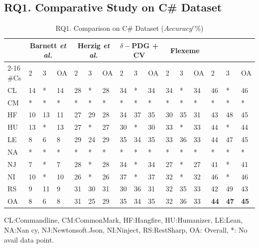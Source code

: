 \subsection{RQ1. Comparative Study on C\# Dataset}
\label{rq1:sec}

\begin{table}[t]
	\caption{RQ1. Comparison on C\# Dataset ($Accuracy^c$\%)}
	\vspace{-0.1in}
	\begin{center}
		\footnotesize
		\tabcolsep 4pt
		\renewcommand{\arraystretch}{1} \begin{tabular}{p{0.2cm}<{\centering}|p{0.25cm}<{\centering}p{0.25cm}<{\centering}p{0.25cm}<{\centering}|p{0.25cm}<{\centering}p{0.25cm}<{\centering}p{0.25cm}<{\centering}|p{0.25cm}<{\centering}p{0.25cm}<{\centering}p{0.25cm}<{\centering}|p{0.25cm}<{\centering}p{0.25cm}<{\centering}p{0.25cm}<{\centering}|p{0.25cm}<{\centering}p{0.25cm}<{\centering}p{0.25cm}<{\centering}}
			
			\hline
		\multirow{2}{*}{}          & \multicolumn{3}{c|}{Barnett {\em et al.}} & \multicolumn{3}{c|}{Herzig {\em et al.}} & \multicolumn{3}{c|}{$\delta-$PDG + CV} & \multicolumn{3}{c|}{Flexeme} & \multicolumn{3}{c}{\bf {\tool}}\\
		\cline{2-16}
	\#Cs	 & 2 & 3 & OA & 2 & 3 & OA & 2 & 3 & OA & 2 & 3 & OA & 2 & 3 & OA \\
			\hline
			CL   & 14 & *    & 14 & 28 & *    & 28 & 34 & *    & 34 & 34 & *    & 34 & 46 & *    & 46 \\
			CM   & *    & *    & *    & *    & *    & *    & *    & *    & *    & *    & *    & *    & *    & *    & *    \\
			HF   & 10 & 13 & 11 & 27 & 29 & 28 & 34 & 37 & 35 & 30 & 35 & 31 & 43 & 48 & 45 \\
			HU   & 13 & *    & 13 & 27 & *    & 27 & 30 & *    & 30 & 33 & *    & 33 & 44 & *    & 44 \\
			LE   & 8 & 6 & 8 & 29 & 24 & 29 & 35 & 34 & 35 & 33 & 36 & 33 & 44 & 47 & 45\\
			NA   & *    & *    & *    & *    & *    & *    & *    & *    & *    & *    & *    & *    & *    & *    & *    \\
			NJ   & 7 & *    & 7 & 28 & *    & 28 & 34 & *    & 34 & 27 & *    & 27 & 41 & *    & 41 \\
			NI   & 10 & *    & 10 & 26 & *    & 26 & 37 & *    & 37 & 32 & *    & 32 & 46 & *    & 46 \\
			RS   & 9 & 11 & 9 & 31 & 30 & 31 & 30 & 36 & 31 & 32 & 35 & 33 & 42 & 49 & 43\\
			\hline
			OA   & 8 & 6 & 8 & 31 & 25 & 29 & 35 & 34 & 35 & 32 & 36 & 33 & {\bf 44} & {\bf 47} & {\bf 45} \\
			\hline
		\end{tabular}
		\label{RQ1-result-1}
		CL:Commandline, CM:CommonMark, HF:Hangfire, HU:Humanizer, LE:Lean, NA:Nan cy, NJ:Newtonsoft.Json, NI:Ninject, RS:RestSharp, OA: Overall, *: No avail data point.
	\end{center}
\end{table}

